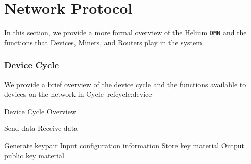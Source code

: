 \documentclass[10pt, nonatbib, nocopyrightspace, reprint]{sigplanconf}
\begin{document}
\section{Network Protocol}

In this section, we provide a more formal overview of the Helium \verb|DMN| and the functions that Devices, Miners, and Routers play in the system.

\subsubsection{Device Cycle}

We provide a brief overview of the device cycle and the functions available to devices on the network in Cycle~ref{cycle:device}

\begin{algorithm}[!htb]
  \DontPrintSemicolon
  \caption{Device Cycle Overview}\label{cycle:device}

   {
    Send data \;
    Receive data \;
  }

   {
    Generate keypair \;
    Input configuration information \;
    Store key material \;
    Output public key material \;
  }
\end{algorithm}
\FloatBarrier
\end{document}
